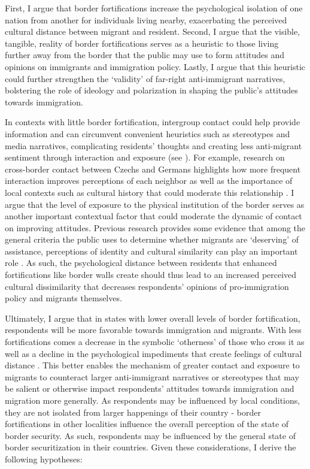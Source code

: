\documentclass[12pt,]{article}
\begin{document}
First, I argue that border fortifications increase the psychological
isolation of one nation from another for individuals living nearby,
exacerbating the perceived cultural distance between migrant and
resident. Second, I argue that the visible, tangible, reality of border
fortifications serves as a heuristic to those living further away from
the border that the public may use to form attitudes and opinions on
immigrants and immigration policy. Lastly, I argue that this heuristic
could further strengthen the `validity' of far-right anti-immigrant
narratives, bolstering the role of ideology and polarization in shaping
the public's attitudes towards immigration.

In contexts with little border fortification, intergroup contact could
help provide information and can circumvent convenient heuristics such
as stereotypes and media narratives, complicating residents' thoughts
and creating less anti-migrant sentiment through interaction and
exposure (see \citet{pettigrew2006}). For example, research on
cross-border contact between Czechs and Germans highlights how more
frequent interaction improves perceptions of each neighbor as well as
the importance of local contexts such as cultural history that could
moderate this relationship \citep{mirwaldt2010}. I argue that the level
of exposure to the physical institution of the border serves as another
important contextual factor that could moderate the dynamic of contact
on improving attitudes. Previous research provides some evidence that
among the general criteria the public uses to determine whether migrants
are `deserving' of assistance, perceptions of identity and cultural
similarity can play an important role
\citep{deconinck2020a, carmel2021}. As such, the psychological distance
between residents that enhanced fortifications like border walls create
should thus lead to an increased perceived cultural dissimilarity that
decreases respondents' opinions of pro-immigration policy and migrants
themselves.

Ultimately, I argue that in states with lower overall levels of border
fortification, respondents will be more favorable towards immigration
and migrants. With less fortifications comes a decrease in the symbolic
`otherness' of those who cross it \citep{jaramillo-dent2021} as well as
a decline in the psychological impediments that create feelings of
cultural distance \citep{mutz2022}. This better enables the mechanism of
greater contact and exposure to migrants to counteract larger
anti-immigrant narratives or stereotypes that may be salient or
otherwise impact respondents' attitudes towards immigration and
migration more generally. As respondents may be influenced by local
conditions, they are not isolated from larger happenings of their
country - border fortifications in other localities influence the
overall perception of the state of border security. As such, respondents
may be influenced by the general state of border securitization in their
countries. Given these considerations, I derive the following
hypotheses:
\end{document}
